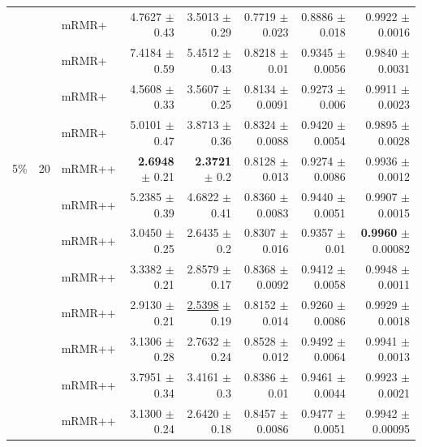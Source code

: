 \begin{longtable}{llp{}rrrrr}
 &  & mRMR+ & 4.7627 {\scriptsize $\pm$ 0.43} & 3.5013 {\scriptsize $\pm$ 0.29} & 0.7719 {\scriptsize $\pm$ 0.023} & 0.8886 {\scriptsize $\pm$ 0.018} & 0.9922 {\scriptsize $\pm$ 0.0016} \\
 &  & mRMR+ & 7.4184 {\scriptsize $\pm$ 0.59} & 5.4512 {\scriptsize $\pm$ 0.43} & 0.8218 {\scriptsize $\pm$ 0.01} & 0.9345 {\scriptsize $\pm$ 0.0056} & 0.9840 {\scriptsize $\pm$ 0.0031} \\
 &  & mRMR+ & 4.5608 {\scriptsize $\pm$ 0.33} & 3.5607 {\scriptsize $\pm$ 0.25} & 0.8134 {\scriptsize $\pm$ 0.0091} & 0.9273 {\scriptsize $\pm$ 0.006} & 0.9911 {\scriptsize $\pm$ 0.0023} \\
 &  & mRMR+ & 5.0101 {\scriptsize $\pm$ 0.47} & 3.8713 {\scriptsize $\pm$ 0.36} & 0.8324 {\scriptsize $\pm$ 0.0088} & 0.9420 {\scriptsize $\pm$ 0.0054} & 0.9895 {\scriptsize $\pm$ 0.0028} \\
\midrule
5\% & 20 & mRMR++ & \textbf{2.6948} {\scriptsize $\pm$ 0.21} & \textbf{2.3721} {\scriptsize $\pm$ 0.2} & 0.8128 {\scriptsize $\pm$ 0.013} & 0.9274 {\scriptsize $\pm$ 0.0086} & 0.9936 {\scriptsize $\pm$ 0.0012} \\
 &  & mRMR++ & 5.2385 {\scriptsize $\pm$ 0.39} & 4.6822 {\scriptsize $\pm$ 0.41} & 0.8360 {\scriptsize $\pm$ 0.0083} & 0.9440 {\scriptsize $\pm$ 0.0051} & 0.9907 {\scriptsize $\pm$ 0.0015} \\
 &  & mRMR++ & 3.0450 {\scriptsize $\pm$ 0.25} & 2.6435 {\scriptsize $\pm$ 0.2} & 0.8307 {\scriptsize $\pm$ 0.016} & 0.9357 {\scriptsize $\pm$ 0.01} & \textbf{0.9960} {\scriptsize $\pm$ 0.00082} \\
 &  & mRMR++ & 3.3382 {\scriptsize $\pm$ 0.21} & 2.8579 {\scriptsize $\pm$ 0.17} & 0.8368 {\scriptsize $\pm$ 0.0092} & 0.9412 {\scriptsize $\pm$ 0.0058} & 0.9948 {\scriptsize $\pm$ 0.0011} \\
 &  & mRMR++ & 2.9130 {\scriptsize $\pm$ 0.21} & \underline{2.5398} {\scriptsize $\pm$ 0.19} & 0.8152 {\scriptsize $\pm$ 0.014} & 0.9260 {\scriptsize $\pm$ 0.0086} & 0.9929 {\scriptsize $\pm$ 0.0018} \\
 &  & mRMR++ & 3.1306 {\scriptsize $\pm$ 0.28} & 2.7632 {\scriptsize $\pm$ 0.24} & 0.8528 {\scriptsize $\pm$ 0.012} & 0.9492 {\scriptsize $\pm$ 0.0064} & 0.9941 {\scriptsize $\pm$ 0.0013} \\
 &  & mRMR++ & 3.7951 {\scriptsize $\pm$ 0.34} & 3.4161 {\scriptsize $\pm$ 0.3} & 0.8386 {\scriptsize $\pm$ 0.01} & 0.9461 {\scriptsize $\pm$ 0.0044} & 0.9923 {\scriptsize $\pm$ 0.0021} \\
 &  & mRMR++ & 3.1300 {\scriptsize $\pm$ 0.24} & 2.6420 {\scriptsize $\pm$ 0.18} & 0.8457 {\scriptsize $\pm$ 0.0086} & 0.9477 {\scriptsize $\pm$ 0.0051} & 0.9942 {\scriptsize $\pm$ 0.00095} \\

\end{longtable}
